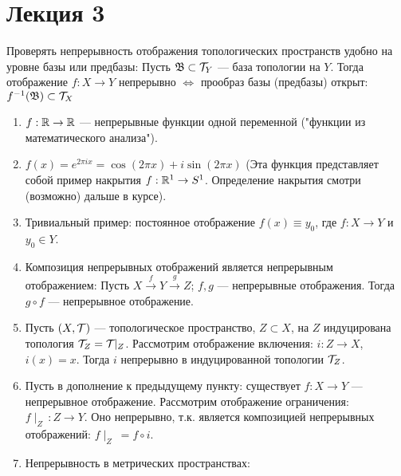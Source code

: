 \section{Лекция 3}



\begin{nota_bene}
    Проверять непрерывность отображения топологических пространств удобно на уровне базы или предбазы:
    Пусть $\mathfrak{B} \subset \mathcal{T}_{Y}$ --- база топологии на $Y$.
    Тогда отображение $f: X \rightarrow Y$ непрерывно $\Leftrightarrow$ прообраз базы (предбазы) открыт: $f^{-1}(\mathfrak{B}) \subset \mathcal{T}_{X}$
\end{nota_bene}

\begin{example} %
    \begin{enumerate}
        \item $f: \mathbb{R} \rightarrow \mathbb{R}$ --- непрерывные функции одной переменной ("функции из математического анализа").
        \item $f(x) = e^{2 \pi i x} = \cos (2\pi x) + i \sin (2\pi x)$ (Эта функция представляет собой пример накрытия $f: \mathbb{R}^1 \rightarrow S^1$. Определение накрытия смотри (возможно) дальше в курсе). %
        \item Тривиальный пример: постоянное отображение $f(x) \equiv  y_0$, где $f: X \rightarrow Y$ и $y_0 \in Y$.
        \item Композиция непрерывных отображений является непрерывным отображением: Пусть $X \overset{f}{\rightarrow} Y \overset{g}{\rightarrow} Z$; $f, g$ --- непрерывные отображения. Тогда $g \circ f$ --- непрерывное отображение.
        \item Пусть $(X, \mathcal{T})$ --- топологическое пространство, $Z \subset X$, на $Z$ индуцирована топология $\mathcal{T}_{Z} = \mathcal{T} \!\! \mid_{Z}$. Рассмотрим отображение включения: $i: Z \rightarrow X$, $i(x) = x$. Тогда $i$ непрерывно в индуцированной топологии $\mathcal{T}_{Z}$.
        \item Пусть в дополнение к предыдущему пункту: существует $f: X \rightarrow Y$ --- непрерывное отображение. Рассмотрим отображение ограничения: $f \! \mid_{Z} \, : Z \rightarrow Y$. Оно непрерывно, т.к. является композицией непрерывных отображений: $f \! \mid_{Z} \ = f \circ i$.
        \item Непрерывность в метрических пространствах:
    \end{enumerate}
\end{example}

